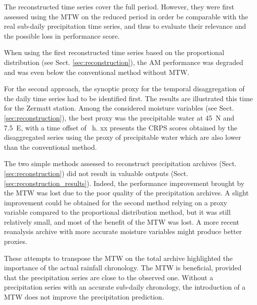 \documentclass[hess, manuscript]{copernicus}
\begin{document}
	
	
	
	The reconstructed time series cover the full period. However, they were first assessed using the MTW on the reduced period in order be comparable with the real sub-daily precipitation time series, and thus to evaluate their relevance and the possible loss in performance score. 
	
	When using the first reconstructed time series based on the proportional distribution (see Sect. \ref{sec:reconstruction}), the AM performance was degraded and was even below the conventional method without MTW.
	
	For the second approach, the synoptic proxy for the temporal disaggregation of the daily time series had to be identified first. The results are illustrated this time for the Zermatt station. Among the considered moisture variables (see Sect. \ref{sec:reconstruction}), the best proxy was the precipitable water at 45\textdegree\ N and 7.5\textdegree\ E, with a time offset of ~h. xx presents the CRPS scores obtained by the disaggregated series using the proxy of precipitable water which are also lower than the conventional method.
	
	
	
	
	The two simple methods assessed to reconstruct precipitation archives (Sect. \ref{sec:reconstruction}) did not result in valuable outputs (Sect. \ref{sec:reconstruction_results}). Indeed, the performance improvement brought by the MTW was lost due to the poor quality of the precipitation archives. A slight improvement could be obtained for the second method relying on a proxy variable compared to the proportional distribution method, but it was still relatively small, and most of the benefit of the MTW was lost. A more recent reanalysis archive with more accurate moisture variables might produce better proxies.
	
	These attempts to transpose the MTW on the total archive highlighted the importance of the actual rainfall chronology. The MTW is beneficial, provided that the precipitation series are close to the observed one. Without a precipitation series with an accurate sub-daily chronology, the introduction of a MTW does not improve the precipitation prediction.
	
	
	
	
	
	
	
\end{document}
